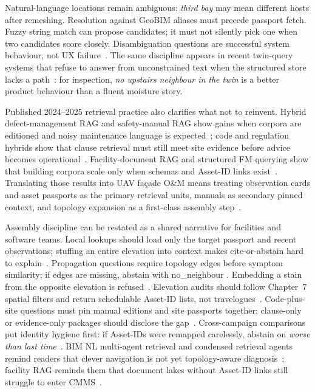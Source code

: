 Natural-language locations remain ambiguous: \emph{third bay} may mean different hosts after remeshing. Resolution against GeoBIM aliases must precede passport fetch. Fuzzy string match can propose candidates; it must not silently pick one when two candidates score closely. Disambiguation questions are successful system behaviour, not UX failure~\cite{zhang2025,han2025,guo2025bimllmquery}. The same discipline appears in recent twin-query systems that refuse to answer from unconstrained text when the structured store lacks a path~\cite{pan2026graphdtgpt,buga2025llmfmsql}: for inspection, \emph{no upstairs neighbour in the twin} is a better product behaviour than a fluent moisture story.

Published 2024--2025 retrieval practice also clarifies what not to reinvent. Hybrid defect-management RAG and safety-manual RAG show gains when corpora are editioned and noisy maintenance language is expected~\cite{jeon2025hybridrag,lee2024ragsafety}; code and regulation hybrids show that clause retrieval must still meet site evidence before advice becomes operational~\cite{joffe2025buildingcodes,he2025regulationhybrid,yang2024promptcode}. Facility-document RAG and structured FM querying show that building corpora scale only when schemas and Asset-ID links exist~\cite{krutli2025fmrags,buga2025llmfmsql,arslan2024ragenergy}. Translating those results into UAV fa\c{c}ade O\&M means treating observation cards and asset passports as the primary retrieval units, manuals as secondary pinned context, and topology expansion as a first-class assembly step~\cite{peng2024,pan2024b,ma2026tenquestions}.




Assembly discipline can be restated as a shared narrative for facilities and software teams. Local lookups should load only the target passport and recent observations; stuffing an entire elevation into context makes cite-or-abstain hard to explain~\cite{lewis2020,peng2024}. Propagation questions require topology edges before symptom similarity; if edges are missing, abstain with no\_neighbour . Embedding a stain from the opposite elevation is refused~\cite{peng2024,jeon2025hybridrag,pan2026graphdtgpt}. Elevation audits should follow Chapter~7 spatial filters and return schedulable Asset-ID lists, not travelogues~\cite{zhang2025,buga2025llmfmsql}. Code-plus-site questions must pin manual editions and site passports together; clause-only or evidence-only packages should disclose the gap~\cite{joffe2025buildingcodes,lee2024ragsafety,he2025regulationhybrid,quan2026bimfacrag}. Cross-campaign comparisons put identity hygiene first: if Asset-IDs were remapped carelessly, abstain on \emph{worse than last time}~\cite{zhang2025,yang2025detreconreg,zhao2026physical}. BIM NL multi-agent retrieval and condensed retrieval agents remind readers that clever navigation is not yet topology-aware diagnosis~\cite{hellin2025bimmas,koh2026bimllmretr,liu2025bimcoder}; facility RAG reminds them that document lakes without Asset-ID links still struggle to enter CMMS~\cite{krutli2025fmrags,quan2026bimfacrag}.





